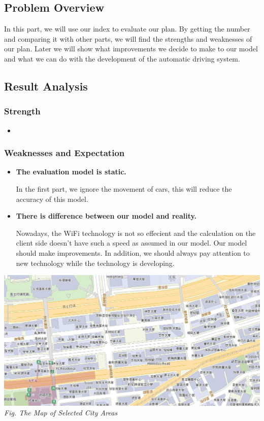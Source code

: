 \documentclass[12pt]{article}
\theoremstyle{definition}
\theoremstyle{remark}
\numberwithin{equation}{section}
\begin{document}
	\subsection{Problem Overview}
	In this part, we will use our index to evaluate our plan. By getting the number and comparing it with other parts, we will find the strengths and weaknesses of our plan. Later we will show what improvements we decide to make to our model and what we can do with the development of the automatic driving system.
	\subsection{Result Analysis}
	\subsubsection*{Strength}
	\begin{itemize}
		\item \textbf{}
	\end{itemize}
	
	\subsubsection*{Weaknesses and Expectation}
	\begin{itemize}
		\item \textbf{The evaluation model is static.}
		
		In the first part, we ignore the movement of cars, this will reduce the accuracy of this model.
		\item \textbf{There is difference between our model and reality.}
		
		Nowadays, the WiFi technology is not so effecient and the calculation on the client side doesn't have such a speed as assumed in our model. Our model should make improvements. In addition, we should always pay attention to new technology while the technology is developing.
	\end{itemize}
	
	\newpage
	\thispagestyle{empty}
	\renewcommand\refname{Appendix}
	\clearpage
	\begin{center}
		\includegraphics[width=16cm]{map.jpg}
		\small \textit{Fig. The Map of Selected City Areas }
	\end{center}
	
\end{document}
